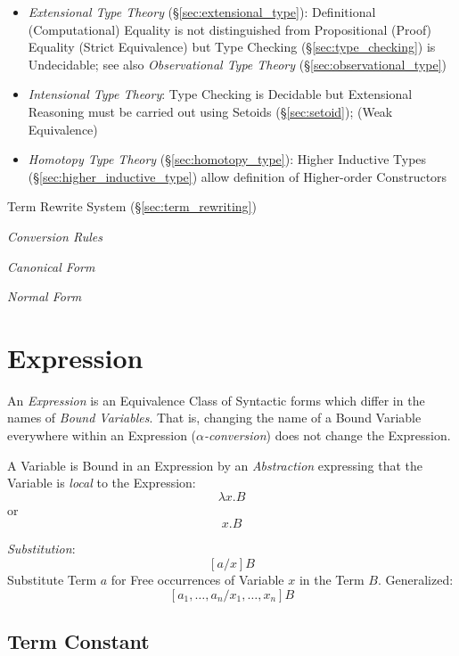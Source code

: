 \begin{itemize}
\item \emph{Extensional Type Theory} (\S\ref{sec:extensional_type}):
  Definitional (Computational) Equality is not distinguished from
  Propositional (Proof) Equality (Strict Equivalence) but Type Checking
  (\S\ref{sec:type_checking}) is Undecidable; see also
  \emph{Observational Type Theory} (\S\ref{sec:observational_type})
\item \emph{Intensional Type Theory}: Type Checking is Decidable but
  Extensional Reasoning must be carried out using Setoids
  (\S\ref{sec:setoid}); (Weak Equivalence)
\item \emph{Homotopy Type Theory} (\S\ref{sec:homotopy_type}): Higher
  Inductive Types (\S\ref{sec:higher_inductive_type}) allow definition
  of Higher-order Constructors
\end{itemize}

Term Rewrite System (\S\ref{sec:term_rewriting})

\emph{Conversion Rules}

\emph{Canonical Form}

\emph{Normal Form}



\section{Expression}\label{sec:type_expression}

An \emph{Expression} is an Equivalence Class of Syntactic forms which
differ in the names of \emph{Bound Variables}. That is, changing the
name of a Bound Variable everywhere within an Expression
(\emph{$\alpha$-conversion}) does not change the Expression.

A Variable is Bound in an Expression by an \emph{Abstraction}
expressing that the Variable is \emph{local} to the Expression:
\[
  \lambda x.B
\]
or
\[
  x.B
\]

\emph{Substitution}:
\[
  [a/x]B
\]
Substitute Term $a$ for Free occurrences of Variable $x$ in the Term
$B$. Generalized:
\[
  [a_1,\ldots,a_n / x_1,\ldots,x_n]B
\]



\subsection{Term Constant}\label{sec:term_constant}

